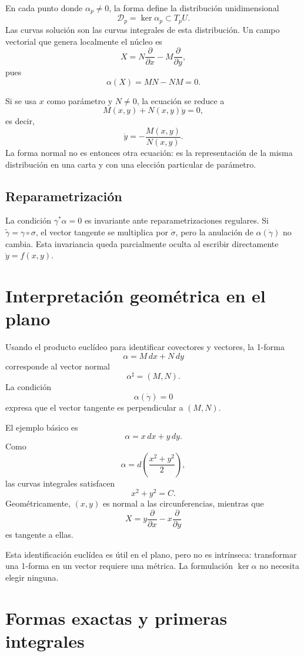 \documentclass[12pt,a4paper]{article}
\begin{document}
	En cada punto donde \(\alpha_p\neq 0\), la forma define la distribución unidimensional
	\[
	\mathcal{D}_p=\ker\alpha_p\subset T_pU.
	\]
Las curvas solución son las curvas integrales de esta distribución. Un campo vectorial que genera localmente el núcleo es
	\[
	X
	=
	N\frac{\partial}{\partial x}
	-
	M\frac{\partial}{\partial y},
	\]
pues
	\[
	\alpha(X)=MN-NM=0.
	\]

	Si se usa \(x\) como parámetro y \(N\neq 0\), la ecuación se reduce a
	\[
	M(x,y)+N(x,y)\dot{y}=0,
	\]
es decir,
	\[
	\dot{y}=-\frac{M(x,y)}{N(x,y)}.
	\]
La forma normal no es entonces otra ecuación: es la representación de la misma distribución en una carta y con una elección particular de parámetro.

	\subsection{Reparametrización}

	La condición \(\gamma^*\alpha=0\) es invariante ante reparametrizaciones regulares. Si \(\widetilde{\gamma}=\gamma\circ\sigma\), el vector tangente se multiplica por \(\dot{\sigma}\), pero la anulación de \(\alpha(\dot{\gamma})\) no cambia. Esta invariancia queda parcialmente oculta al escribir directamente \(\dot{y}=f(x,y)\).

	\clearpage
	\section{Interpretación geométrica en el plano}

	Usando el producto euclídeo para identificar covectores y vectores, la 1-forma
	\[
	\alpha=M\,dx+N\,dy
	\]
corresponde al vector normal
	\[
	\alpha^\sharp=(M,N).
	\]
La condición
	\[
	\alpha(\dot{\gamma})=0
	\]
expresa que el vector tangente es perpendicular a \((M,N)\).

	El ejemplo básico es
	\[
	\alpha=x\,dx+y\,dy.
	\]
Como
	\[
	\alpha=d\left(\frac{x^2+y^2}{2}\right),
	\]
las curvas integrales satisfacen
	\[
	x^2+y^2=C.
	\]
Geométricamente, \((x,y)\) es normal a las circunferencias, mientras que
	\[
	X
	=
	y\frac{\partial}{\partial x}
	-
	x\frac{\partial}{\partial y}
	\]
es tangente a ellas.

	Esta identificación euclídea es útil en el plano, pero no es intrínseca: transformar una 1-forma en un vector requiere una métrica. La formulación \(\ker\alpha\) no necesita elegir ninguna.

	\clearpage
	\section{Formas exactas y primeras integrales}
\end{document}
